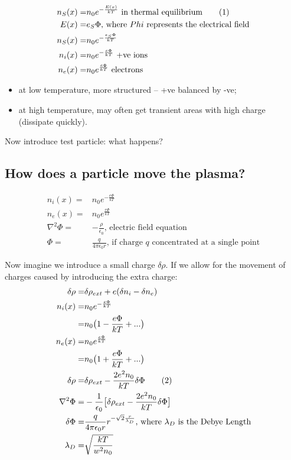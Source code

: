 \documentclass[]{article}
\newcommand\numberthis{\addtocounter{equation}{1}\tag{\theequation}}
\begin{document}
\begin{align*}
n_S(x)=&n_0 e^{- \frac{E(x)}{kT}} \text{ in thermal equilibrium} \numberthis \label{eq:plasma_thermal}\\
E(x) =& e_S\Phi\text{, where $Phi$ represents the electrical field}\\
n_S(x)=&n_0 e^{- \frac{e_S\Phi}{kT}}\\
n_i(x)=&n_0 e^{- \frac{e\Phi}{kT}}\text{ +ve ions}\\
n_e(x)=&n_0 e^{ \frac{e\Phi}{kT}}\text{ electrons}
\end{align*}

\begin{itemize}
	\item at low temperature, more structured -- +ve balanced by -ve;
	\item at high temperature, may often get transient areas with high charge (dissipate quickly).
\end{itemize}

Now introduce test particle: what happens?

\subsection{How does a particle move the plasma?}

\begin{align*}
n_i(x)=&n_0 e^{- \frac{e\Phi}{kT}}\\
n_e(x)=&n_0 e^{ \frac{e\Phi}{kT}}\\
\nabla^2 \Phi=& -\frac{\rho}{\epsilon_0} \text{, electric field equation}\\
\Phi =& \frac{q}{4 \pi \epsilon_0 r} \text{, if charge $q$ concentrated at a single point}
\end{align*}

Now imagine we introduce a small charge $\delta \rho$. If we allow for the movement of charges caused by introducing the extra charge:
\begin{align*}
\delta \rho =& \delta \rho_{ext} + e(\delta n_i - \delta n_e)\\
n_i(x)=&n_0 e^{- \frac{e\Phi}{kT}}\\
=& n_0\big(1 - \frac{e\Phi}{kT} +...\big)\\
n_e(x)=&n_0 e^{ \frac{e\Phi}{kT}}\\
=& n_0\big(1 + \frac{e\Phi}{kT} +...\big)\\
\delta \rho =& \delta \rho_{ext} - \frac{2 e^2 n_0}{kT}\delta \Phi \numberthis \label{eq:delta:rho}\\
\nabla^2 \Phi =& - \frac{1}{\epsilon_0} \big[\delta \rho_{ext} - \frac{2 e^2 n_0}{kT} \delta \Phi\big]\\
\delta \Phi =& \frac{q}{4 \pi \epsilon_0 r} r^{- \sqrt{2} \frac{r}{\lambda_D}}\text{, where $\lambda_D$ is the Debye Length}\\
\lambda_D =& \sqrt{\frac{kT}{w^2 n_0}}
\end{align*}
\end{document}
